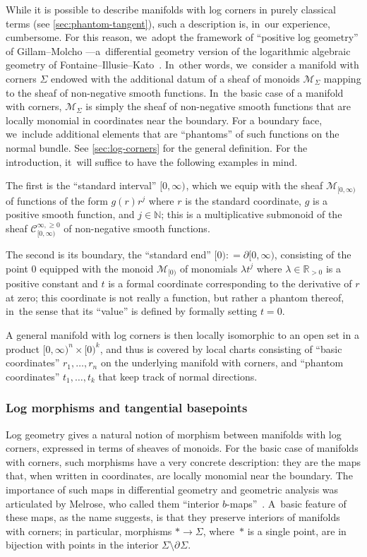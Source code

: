 \documentclass[10pt]{amsart}
\theoremstyle{definition}
\theoremstyle{remark}
\newcommand{\RR}{\mathbb{R}}
\newcommand{\NN}{\mathbb{N}}
\newcommand{\model}[2]{\halfspc{#1}\times[0)^{#2}}
\newcommand{\halfspc}[1]{[0,\infty)^{#1}}
\renewcommand{\ge}{\geqslant}
\newcommand{\defas}{\mathrel{\mathop:}=}
\newcommand{\cM}{\mathscr{M}}
\newcommand{\Cinfge}[1]{\mathscr{C}^{\infty, \ge 0}_{#1}}
\newcommand{\Sig}{\Sigma}
\newcommand{\bdSig}[1][]{\partial^{#1}\Sigma}
\begin{document}
While it is possible to describe manifolds with log corners in purely classical terms (see \autoref{sec:phantom-tangent}), such a description is, in~our experience, cumbersome. For this reason, we~adopt the framework of ``positive log geometry'' of Gillam--Molcho \cite{GillamMolcho}---a~differential geometry version of the logarithmic algebraic geometry of Fontaine--Illusie--Kato~\cite{Kato1989a, IllusieLogSpaces, Ogus}. In~other words, we~consider a manifold with corners $\Sig$ endowed with the additional datum of a sheaf of monoids $\cM_\Sig$ mapping to the sheaf of non-negative smooth functions. In~the basic case of a manifold with corners, $\cM_\Sig$ is simply the sheaf of non-negative smooth functions that are locally monomial in coordinates near the boundary. For a boundary face, we~include additional elements that are ``phantoms'' of such functions on the normal bundle. See \autoref{sec:log-corners} for the general definition. For the introduction, it~will suffice to have the following examples in mind.

The first is the ``standard interval'' $\halfspc{}$, which we equip with the sheaf $\cM_{\halfspc{}}$ of functions of the form $g(r)r^j$ where $r$ is the standard coordinate, $g$ is a positive smooth function, and $j \in \NN$; this is a multiplicative submonoid of the sheaf $\Cinfge{\halfspc{}}$ of non-negative smooth functions.

The second is its boundary, the ``standard end'' $[0) \defas \partial [0,\infty)$, consisting of the point $0$ equipped with the monoid $\cM_{[0)}$ of monomials $\lambda t^j$ where $\lambda \in \RR_{>0}$ is a positive constant and $t$ is a formal coordinate corresponding to the derivative of $r$ at zero; this coordinate is not really a function, but rather a phantom thereof, in~the sense that its ``value'' is defined by formally setting $t=0$.

A general manifold with log corners is then locally isomorphic to an open set in a product $\model{n}{k}$, and thus is covered by local charts consisting of ``basic coordinates'' $r_1,\ldots,r_n$ on the underlying manifold with corners, and ``phantom coordinates'' $t_1,\ldots,t_k$ that keep track of normal directions.

\subsubsection{Log morphisms and tangential basepoints}
Log geometry gives a natural notion of morphism between manifolds with log corners, expressed in terms of sheaves of monoids. For the basic case of manifolds with corners, such morphisms have a very concrete description: they are the maps that, when written in coordinates, are locally monomial near the boundary. The importance of such maps in differential geometry and geometric analysis was articulated by Melrose, who called them ``interior $b$-maps''~\cite{Melrose1992}. A~basic feature of these maps, as the name suggests, is that they preserve interiors of manifolds with corners; in particular, morphisms $* \to \Sig$, where~$*$ is a single point, are in bijection with points in the interior $\Sig\setminus\bdSig$.
\end{document}
